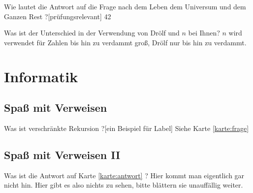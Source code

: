 \documentclass[a6paper,10pt, print,grid=front,%
,toc
]{kartei}
\begin{document}
  \begin{karte}[Lebensphilosophie]{Wie lautet die Antwort auf die Frage nach dem Leben dem Universum und dem Ganzen Rest ?}[prüfungsrelevant]
  42
  \end{karte}
  \begin{karte}[Zahlenkunde]{Was ist der Unterschied in der Verwendung von Drölf und $n$ bei Ihnen?}
  $n$ wird verwendet für Zahlen bis hin zu verdammt groß, Drölf nur bis hin zu verdammt.
  \end{karte}
  \section{Informatik}
  \subsection{Spaß mit Verweisen}
  \renewcommand{\kommentarstil}{\textsc}
  \begin{karte}{Was ist verschränkte Rekursion ?}[ein Beispiel für Label]
  \label{karte:antwort} Siehe Karte \ref{karte:frage}
  \end{karte}
  \subsection{Spaß mit Verweisen II}
  \begin{karte}{Was ist die Antwort auf Karte \ref{karte:antwort} ?}
  \label{karte:frage}
    Hier kommt man eigentlich gar nicht hin. Hier gibt es also nichts zu sehen, bitte blättern sie unauffällig weiter.
  \end{karte}
\end{document}

